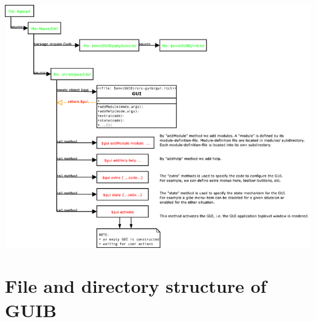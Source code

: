 \documentclass[12pt]{article}
\begin{document}
\includegraphics[width=1.0\textwidth]{diagrams/TkPWscf.png}

\section{File and directory structure of GUIB}
\end{document}
